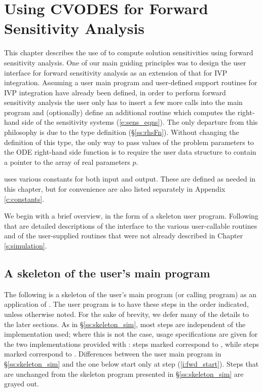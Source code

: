 \chapter{Using CVODES for Forward Sensitivity Analysis}\label{s:forward}

This chapter describes the use of {\cvodes} to compute solution sensitivities using
forward sensitivity analysis. One of our main guiding principles was to design 
the {\cvodes} user interface for forward sensitivity analysis as an extension of
that for IVP integration. Assuming a user main program and user-defined support 
routines for IVP integration have already been defined, in order to perform 
forward sensitivity analysis the user only has to insert a few more calls 
into the main program and (optionally) define an additional routine which
computes the right-hand side of the sensitivity systems (\ref{e:sens_eqns}). 
The only departure from this philosophy is due to the  type definition
(\S\ref{ss:rhsFn}). Without changing the definition of this type, the
only way to pass values of the problem parameters to the ODE right-hand side
function is to require the user data structure  to contain a pointer
to the array of real parameters $p$.

{\cvodes} uses various constants for both input and output.  These are
defined as needed in this chapter, but for convenience are also listed
separately in Appendix \ref{c:constants}.

We begin with a brief overview, in the form of a skeleton user program.
Following that are detailed descriptions of the interface to the
various user-callable routines and of the user-supplied routines that were not
already described in Chapter \ref{s:simulation}.

\section{A skeleton of the user's main program}\label{s:forward_usage}

The following is a skeleton of the user's main program (or calling
program) as an application of {\cvodes}. The user program is to have these 
steps in the order indicated, unless otherwise noted.
For the sake of brevity, we defer many of the details to the later sections.
As in \S\ref{ss:skeleton_sim}, most steps are independent of the {\nvector}
implementation used; where this is not the case, usage specifications are given for the
two implementations provided with {\cvodes}: steps marked {\p} correspond to 
{\nvecp}, while steps marked {\s} correspond to {\nvecs}.
Differences between the user main program in \S\ref{ss:skeleton_sim} and
the one below start only at step (\ref{i:fwd_start}).
Steps that are unchanged from the skeleton program presented in
\S\ref{ss:skeleton_sim} are grayed out.

